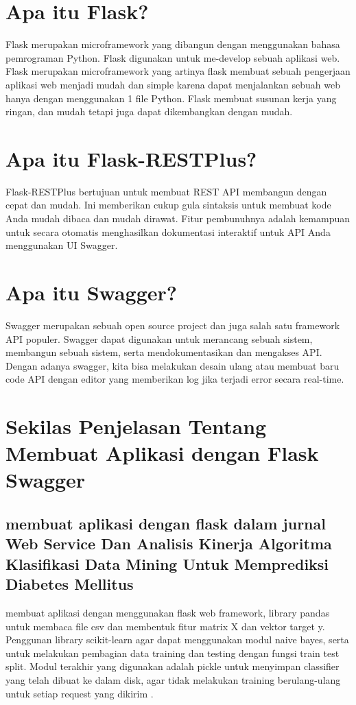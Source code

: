 \documentclass[12pt]{article}
\begin{document}
\section{Apa itu Flask?}
Flask merupakan microframework yang dibangun dengan
menggunakan bahasa pemrograman Python. Flask digunakan
untuk me-develop sebuah aplikasi web. Flask merupakan
microframework yang artinya flask membuat sebuah pengerjaan
aplikasi web menjadi mudah dan simple karena dapat menjalankan
sebuah web hanya dengan menggunakan 1 file Python. Flask
membuat susunan kerja yang ringan, dan mudah tetapi juga dapat
dikembangkan dengan mudah\cite{gunawan2018aplikasi}.

\section{Apa itu Flask-RESTPlus?}
Flask-RESTPlus bertujuan untuk membuat REST API membangun dengan cepat dan mudah. Ini memberikan cukup gula sintaksis untuk membuat kode Anda mudah dibaca dan mudah dirawat. Fitur pembunuhnya adalah kemampuan untuk secara otomatis menghasilkan dokumentasi interaktif untuk API Anda menggunakan UI Swagger.

\section{Apa itu Swagger?}
Swagger merupakan sebuah open source project dan juga salah satu framework API populer. Swagger dapat digunakan untuk merancang sebuah sistem, membangun sebuah sistem, serta mendokumentasikan dan mengakses API. Dengan adanya swagger, kita bisa melakukan desain ulang atau membuat baru code API dengan editor yang memberikan log jika terjadi error secara real-time.

\section{Sekilas Penjelasan Tentang Membuat Aplikasi dengan Flask Swagger}

\subsection{membuat aplikasi dengan flask dalam jurnal Web Service Dan  Analisis Kinerja Algoritma Klasifikasi Data Mining Untuk Memprediksi Diabetes Mellitus}
membuat aplikasi dengan menggunakan flask web framework, library pandas untuk membaca file csv dan membentuk fitur matrix X dan vektor target y. Penggunan library scikit-learn agar dapat menggunakan modul naive bayes, serta untuk melakukan pembagian data training dan testing dengan fungsi train test split. Modul terakhir yang digunakan adalah pickle untuk menyimpan classifier yang telah dibuat ke dalam disk, agar tidak melakukan training berulang-ulang untuk setiap request yang dikirim \cite{setyawan2017implementasi}. 
\end{document}
